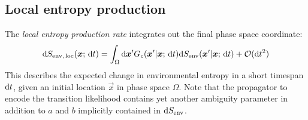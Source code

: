\subsection{Local entropy production}
\newcommand\SEnvLoc{\ensuremath{S_\text{env,\,loc}}}

The \emph{local entropy production rate} integrates out the final phase space coordinate:
%
\begin{equation}
	\d\SEnvLoc(\vec x;\,\d t) = \int_\Omega\d\vec x' G_c(\vec x'|\vec x;\,\d t) \d\SEnv(\vec x'|\vec x;\,\d t) + \Cal O(\d t^2)
\end{equation}
%
This describes the expected change in environmental entropy in a short timespan \(\mathrm{d} t\), given an initial location \(\vec x\) in phase space \(\Omega\). Note that the propagator to encode the transition likelihood contains yet another ambiguity parameter in addition to \(a\) and \(b\) implicitly contained in \(\mathrm{d}S_\text{env}\).

